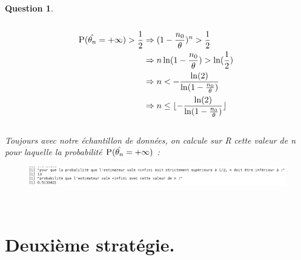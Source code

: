 \documentclass[a4paper,11pt]{article}
\newtheorem{exo1}{Question}
\begin{document}
\begin{exo1} \ \\ \\
\begin{equation}
\begin{aligned}
\textsc{P}(\hat{\theta_{n}}=+\infty) > \frac{1}{2} & \Rightarrow (1-\frac{n_{0}}{\theta})^{n} > \frac{1}{2} \ \\
& \Rightarrow n\ln(1-\frac{n_{0}}{\theta}) > \ln(\frac{1}{2}) \ \\
& \Rightarrow n < -\frac{\ln(2)}{\ln(1-\frac{n_{0}}{\theta})} \ \\
& \Rightarrow n \leq \lfloor-\frac{\ln(2)}{\ln(1-\frac{n_{0}}{\theta})}\rfloor
\end{aligned}
\end{equation} \ \\
Toujours avec notre échantillon de données, on calcule sur R cette valeur de n pour laquelle la probabilité $\textsc{P}(\hat{\theta_{n}}=+\infty)$ :
\begin{figure}[h]
\includegraphics[scale=0.5]{images/Q1_6.png}
\end{figure} \ \\
\end{exo1}

\newpage

\section{Deuxième stratégie.}
\end{document}
